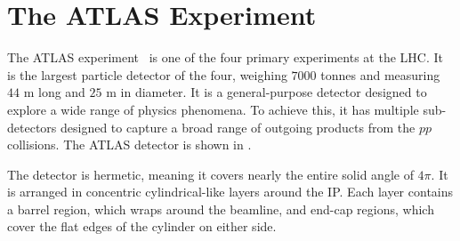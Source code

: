 \begin{table}[h!]
    \centering
    \caption{Overview of the different LHC runs~\cite{LHCRun2,LHCRun3,run1data, run2data, run3data}. Values for Run 3 are preliminary as data is still being collected.}
    \label{tab:lhc_runs}
\end{table}

\section{The ATLAS Experiment}

The ATLAS experiment~\cite{ATLAS, ATLASRun3} is one of the four primary experiments at the LHC\@.
It is the largest particle detector of the four, weighing $7000$ tonnes and measuring $44$ m long and $25$ m in diameter.
It is a general-purpose detector designed to explore a wide range of physics phenomena.
To achieve this, it has multiple sub-detectors designed to capture a broad range of outgoing products from the $pp$ collisions.
The ATLAS detector is shown in .

The detector is hermetic, meaning it covers nearly the entire solid angle of $4\pi$.
It is arranged in concentric cylindrical-like layers around the IP\@.
Each layer contains a barrel region, which wraps around the beamline, and end-cap regions, which cover the flat edges of the cylinder on either side.

